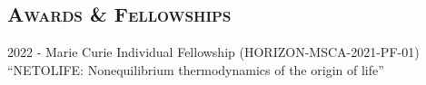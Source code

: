\documentclass[margin,line,centered]{res}
\begin{document}
\begin{resume}










\section{\textsc{Awards \& Fellowships}}
2022 - Marie Curie Individual Fellowship (HORIZON-MSCA-2021-PF-01)\\
``NETOLIFE: Nonequilibrium thermodynamics of the origin of life''


\end{resume}
\end{document}
